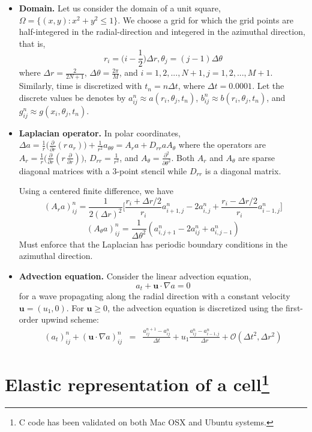 \documentclass[11pt]{article}
\renewcommand{\vec}[1]{\bm{#1}}                 %
\begin{document}
\begin{itemize}
\item \textbf{Domain.} Let us consider the domain of a unit square, $\Omega = \{(x,y): x^2 + y^2 \leq 1\}$. We choose a grid for which the grid points are half-integered in the radial-direction and integered in the azimuthal direction, that is,
$$r_i = \Big(i-\frac{1}{2} \Big) \Delta r, \theta_j = (j-1) \Delta \theta$$
where $\Delta r = \frac{2}{2N+1}$, $\Delta \theta = \frac{2\pi}{M}$, and $i = 1,2,...,N+1, j=1,2,...,M+1$. Similarly, time is discretized with $t_n = n \Delta t$, where $\Delta t = 0.0001$. Let the discrete values be denotes by $a^n_{ij} \approx a(r_i,\theta_j,t_n)$, $b^n_{ij} \approx b(r_i,\theta_j,t_n)$, and $g^n_{ij} \approx g(x_i,\theta_j,t_n)$.

\item \textbf{Laplacian operator.} In polar coordinates, $\Delta a = \frac{1}{r} \Big(\frac{\partial}{\partial r} (r\,a_r) \Big) + \frac{1}{r^2} a_{\theta \theta} = A_r a + D_{rr} a A_\theta$ where the operators are $A_r = \frac{1}{r} \Big(\frac{\partial}{\partial r} (r\, \frac{\partial}{\partial r}) \Big)$, $D_{rr} = \frac{1}{r^2}$, and $A_\theta = \frac{\partial^2}{\partial \theta^2}$. Both $A_r$ and $A_\theta$ are sparse diagonal matrices with a 3-point stencil while $D_{rr}$ is a diagonal matrix.

Using a centered finite difference, we have
$$(A_r a)^n_{ij} = \frac{1}{2 (\Delta r)^2} \Big[ \frac{r_i + \Delta r/2}{r_i} a^n_{i+1,j} - 2 a^n_{i,j} + \frac{r_i - \Delta r/2}{r_i} a^n_{i-1,j}\Big]$$
$$(A_\theta a)^n_{ij} = \frac{1}{\Delta \theta^2} (a^n_{i,j+1} - 2a^n_{ij} + a^n_{i,j-1})$$
\noindent Must enforce that the Laplacian has periodic boundary conditions in the azimuthal direction.

\item \textbf{Advection equation.} Consider the linear advection equation,
$$a_t + \vec{u} \cdot \nabla{a} = 0$$
for a wave propagating along the radial direction with a constant velocity $\vec{u} = (u_1,0)$.
For $\vec{u} \geq 0$, the advection equation is discretized using the first-order upwind scheme:
\begin{eqnarray*}(a_t)^n_{ij} + (\vec{u} \cdot \nabla a)^n_{ij} &=& \frac{a^{n+1}_{ij} - a^n_{ij}}{\Delta t} + u_1 \frac{a^n_{ij}-a^n_{i-1,j}}{\Delta r} + \mathcal{O}{(\Delta t^2, \Delta r^2)}
\end{eqnarray*}
\end{itemize}

\section*{Elastic representation of a cell\footnote{C code has been validated on both Mac OSX and Ubuntu systems.}}
\end{document}
